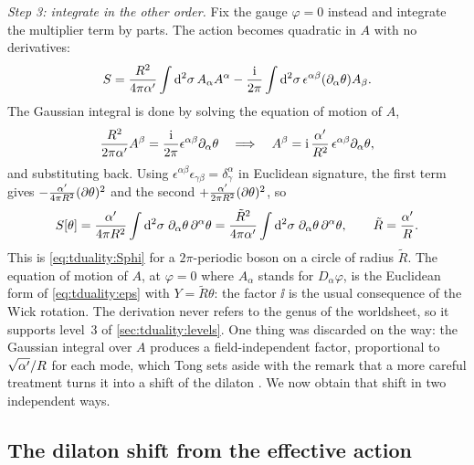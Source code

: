 \emph{Step 3: integrate in the other order.} Fix the gauge $\varphi=0$ instead and
integrate the multiplier term by parts. The action becomes quadratic in $A$ with no
derivatives:
\[
  S=\frac{R^2}{4\pi\alpha'}\int\mathrm{d}^2\sigma\,A_\alpha A^\alpha
    -\frac{\mathrm{i}}{2\pi}\int\mathrm{d}^2\sigma\,\epsilon^{\alpha\beta}(\partial_\alpha\theta)A_\beta .
\]
The Gaussian integral is done by solving the equation of motion of $A$,
\[
  \frac{R^2}{2\pi\alpha'}A^\beta=\frac{\mathrm{i}}{2\pi}\epsilon^{\alpha\beta}\partial_\alpha\theta
  \quad\Longrightarrow\quad
  A^\beta=\mathrm{i}\,\frac{\alpha'}{R^2}\,\epsilon^{\alpha\beta}\partial_\alpha\theta ,
\]
and substituting back. Using $\epsilon^{\alpha\beta}\epsilon_{\gamma\beta}=\delta^\alpha_\gamma$ in
Euclidean signature, the first term gives $-\frac{\alpha'}{4\pi R^2}(\partial\theta)^2$ and the
second $+\frac{\alpha'}{2\pi R^2}(\partial\theta)^2$, so
\begin{equation}\label{eq:tduality:Stheta}
  S[\theta]=\frac{\alpha'}{4\pi R^2}\int\mathrm{d}^2\sigma\;\partial_\alpha\theta\,\partial^\alpha\theta
   =\frac{\tilde R^2}{4\pi\alpha'}\int\mathrm{d}^2\sigma\;\partial_\alpha\theta\,\partial^\alpha\theta,
   \qquad\tilde R=\frac{\alpha'}{R}.
\end{equation}
This is \eqref{eq:tduality:Sphi} for a $2\pi$-periodic boson on a circle of radius $\tilde R$.
The equation of motion of $A$, at $\varphi=0$ where $A_\alpha$ stands for $D_\alpha\varphi$, is
the Euclidean form of \eqref{eq:tduality:eps} with $Y=\tilde R\theta$: the factor $\ii$ is the
usual consequence of the Wick rotation. The derivation never refers to the genus of the
worldsheet, so it supports level~3 of \cref{sec:tduality:levels}. One thing was discarded on
the way: the Gaussian integral over $A$ produces a field-independent factor, proportional to
$\sqrt{\alpha'}/R$ for each mode, which Tong sets aside with the remark that a more careful
treatment turns it into a shift of the dilaton .
We now obtain that shift in two independent ways.

\subsection{The dilaton shift from the effective action}

